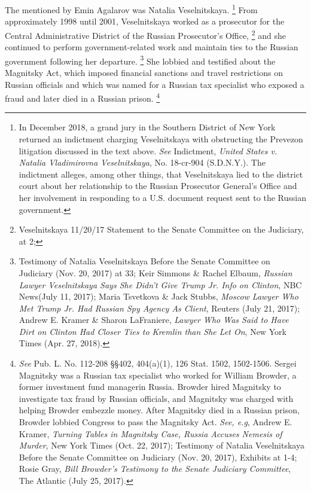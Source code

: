The  mentioned by Emin Agalarov was Natalia Veselnitskaya.%
\footnote{In December 2018, a grand jury in the Southern District of New York returned an indictment charging Veselnitskaya with obstructing the Prevezon litigation discussed in the text above. 
\textit{See} Indictment, \textit{United States v. Natalia Vladimirovna Veselnitskaya}, No. 18-cr-904 (S.D.N.Y.). 
The indictment alleges, among other things, that Veselnitskaya lied to the district court about her relationship to the Russian Prosecutor General’s Office and her involvement in responding to a U.S. document request sent to the Russian government.}
From approximately 1998 until 2001, Veselnitskaya worked as a prosecutor for the Central Administrative District of the Russian Prosecutor's Office,%
\footnote{Veselnitskaya 11/20/17 Statement to the Senate Committee on the Judiciary, at 2; 
}
and she continued to perform government-related work and maintain ties to the Russian government following her departure.%
\footnote{Testimony of Natalia Veselnitskaya Before the Senate Committee on Judiciary (Nov. 20, 2017) at 33; 
Keir Simmons \& Rachel Elbaum, \textit{Russian Lawyer Veselnitskaya Says She Didn’t Give Trump Jr. Info on Clinton}, NBC News(July 11, 2017); 
Maria Tsvetkova \& Jack Stubbs, \textit{Moscow Lawyer Who Met Trump Jr. Had Russian Spy Agency As Client}, Reuters (July 21, 2017); 
Andrew E. Kramer \& Sharon LaFraniere, \textit{Lawyer Who Was Said to Have Dirt on Clinton Had Closer Ties to Kremlin than She Let On}, New York Times (Apr. 27, 2018).}
She lobbied and testified about the Magnitsky Act, which imposed financial sanctions and travel restrictions on Russian officials and which was named for a Russian tax specialist who exposed a fraud and later died in a Russian prison.%
\footnote{\textit{See} Pub. L. No. 112-208 \S\S 402, 404(a)(1), 126 Stat. 1502, 1502-1506. 
Sergei Magnitsky was a Russian tax specialist who worked for William Browder, a former investment fund managerin Russia.
Browder hired Magnitsky to investigate tax fraud by Russian officials, and Magnitsky was charged with helping Browder embezzle money. 
After Magnitsky died in a Russian prison, Browder lobbied Congress to pass the Magnitsky Act. 
\textit{See, e.g}, Andrew E. Kramer, \textit{Turning Tables in Magnitsky Case, Russia Accuses Nemesis of Murder}, New York Times (Oct. 22, 2017); 
Testimony of Natalia Veselnitskaya Before the Senate Committee on Judiciary (Nov. 20, 2017), Exhibits at 1-4; 
Rosie Gray, \textit{Bill Browder’s Testimony to the Senate Judiciary Committee}, The Atlantic (July 25, 2017).}
